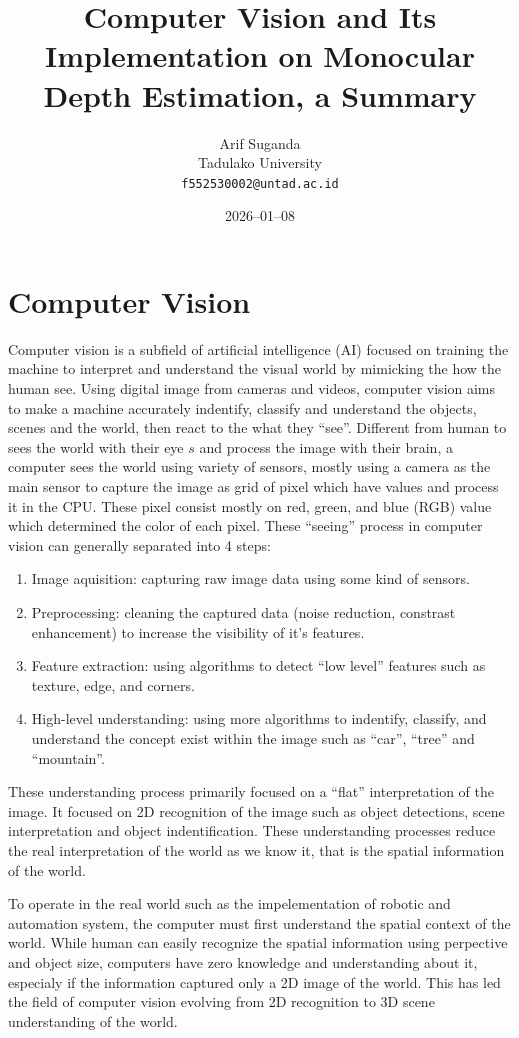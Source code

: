 \documentclass[a4paper,10pt]{article}
\title{Computer Vision and Its Implementation on Monocular Depth Estimation, a Summary}
\author{Arif Suganda\\
        Tadulako University\\
        \texttt{f552530002@untad.ac.id}}
\date{2026--01--08}
\begin{document}
\maketitle

\section{Computer Vision}

Computer vision is a subfield of artificial intelligence (AI) focused on training the machine to interpret and understand the visual world by mimicking the how the human see.
Using digital image from cameras and videos, computer vision aims to make a machine accurately indentify, classify and understand the objects, scenes and the world, then react to the what they ``see''.
Different from human to sees the world with their eye \(s\) and process the image with their brain, a computer sees the world using variety of sensors, mostly using a camera as the main sensor to capture the image as grid of pixel which have values and process it in the CPU\@.
These pixel consist mostly on red, green, and blue (RGB) value which determined the color of each pixel.
These ``seeing'' process in computer vision can generally separated into 4 steps:
\begin{enumerate}
        \item Image aquisition: capturing raw image data using some kind of sensors.
        \item Preprocessing: cleaning the captured data (noise reduction, constrast enhancement) to increase the visibility of it's features.
        \item Feature extraction: using algorithms to detect ``low level'' features such as texture, edge, and corners.
        \item High-level understanding: using more algorithms to indentify, classify, and understand the concept exist within the image such as ``car'', ``tree'' and ``mountain''.
\end{enumerate}

These understanding process primarily focused on a ``flat'' interpretation of the image.
It focused on 2D recognition of the image such as object detections, scene interpretation and object indentification.
These understanding processes reduce the real interpretation of the world as we know it, that is the spatial information of the world.

To operate in the real world such as the impelementation of robotic and automation system, the computer must first understand the spatial context of the world.
While human can easily recognize the spatial information using perpective and object size, computers have zero knowledge and understanding about it, especialy if the information captured only a 2D image of the world.
This has led the field of computer vision evolving from 2D recognition to 3D scene understanding of the world.
\end{document}

